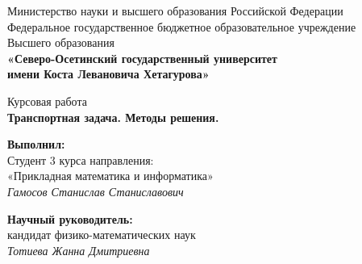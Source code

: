 \documentclass[a4paper,12pt]{article}
\begin{document}
\setcounter{page}{0}
\renewcommand{\labelenumii}{\arabic{enumi}.\arabic{enumii}.}


\begin{center}
	\small{Министерство науки и высшего образования Российской Федерации}\\
	\small{Федеральное государственное бюджетное образовательное учреждение}\\
	\small{Высшего образования}\\
	\small{\textbf{«Северо-Осетинский государственный университет\\
			имени Коста Левановича Хетагурова»}}\\
		
	\hfill \break
	\hfill \break
	\hfill \break
	\hfill \break
	\hfill \break
	\hfill \break
	\hfill \break
	\hfill \break
	\hfill \break
	
	\normalsize{Курсовая работа}\\
	\large{\textbf{Транспортная задача. Методы решения.}}\\
	
	\hfill \break
	\hfill \break
	\hfill \break
	\hfill \break
	\hfill \break
	\hfill\break
\end{center}

\begin{flushright}
	\textbf{Выполнил:}\\
	Студент 3 курса направления:\\
	«Прикладная математика и информатика»\\
	\textit{Гамосов Станислав Станиславович}\\
\end{flushright}

\hfill

\begin{flushright}
	\textbf{Научный руководитель:}\\
	кандидат физико-математических наук\\
	\textit{Тотиева Жанна Дмитриевна}\\
\end{flushright}

\hfill
\end{document}
